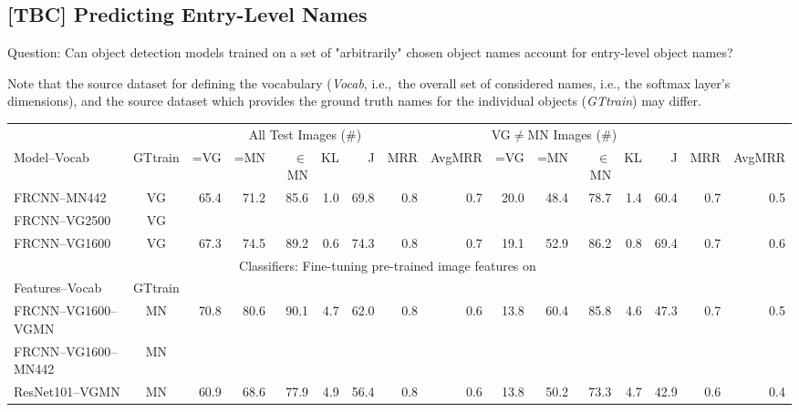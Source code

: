 \subsection{[TBC] Predicting Entry-Level Names}
\label{sect:exp_entry}
Question: Can object detection models trained on a set of "arbitrarily" chosen object names account for entry-level object names? 

Note that the source dataset for defining the vocabulary (\textsl{Vocab}, i.e.,\ the overall set of considered names, i.e., the softmax layer's dimensions), and the source dataset which provides the ground truth names for the individual objects (\textsl{GTtrain}) may differ.  
\begin{table}[t]
	\centering
	\small
	\begin{tabular}{l|c|r@{~}r@{~}r@{~}r@{~}r@{~}r@{~}r|@{~}r@{~}r@{~}r@{~}r@{~}r@{~}r@{~}r@{~}}
		\toprule
		&   & \multicolumn{6}{c}{All Test Images ($\#$)} 
		& \multicolumn{6}{c}{VG$\neq$MN Images ($\#$)}\\	
		Model--Vocab	 
		&  GTtrain &  =VG & =MN & $\in$MN  & KL & J & MRR & AvgMRR 
		&  =VG & =MN & $\in$MN  & KL & J & MRR & AvgMRR\\ 
		\midrule
		FRCNN--MN442 & VG &            65.4 &              71.2 &                85.6 &         1.0 &             69.8 &          0.8 &             0.7 &            20.0 &              48.4 &                78.7 &         1.4 &             60.4 &          0.7 &             0.5 \\
		FRCNN--VG2500 & VG \\
		FRCNN--VG1600 & VG &            67.3 &              74.5 &                89.2 &         0.6 &             74.3 &          0.8 &             0.7 &            19.1 &              52.9 &                86.2 &         0.8 &             69.4 &          0.7 &             0.6 \\
		\midrule \midrule
		& \multicolumn{12}{c}{Classifiers: Fine-tuning pre-trained image features on \mn}\\
		Features--Vocab & GTtrain  \\
		\midrule 
		FRCNN--VG1600--VGMN & MN &            70.8 &              80.6 &                90.1 &         4.7 &             62.0 &          0.8 &             0.6 &            13.8 &              60.4 &                85.8 &         4.6 &             47.3 &          0.7 &             0.5 \\ 
		FRCNN--VG1600--MN442 &  MN \\
		\midrule
		ResNet101--VGMN & MN  &            60.9 &              68.6 &                77.9 &         4.9 &             56.4 &          0.8 &             0.6 &            13.8 &              50.2 &                73.3 &         4.7 &             42.9 &          0.6 &             0.4 \\
		

\end{tabular}
\end{table}

